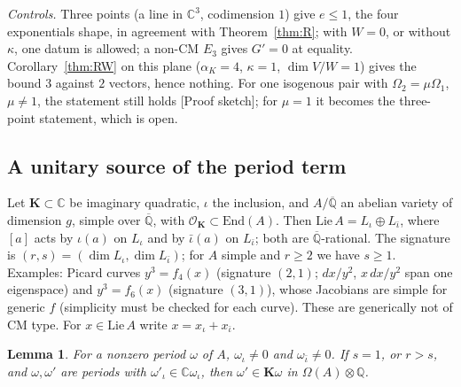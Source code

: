\documentclass[11pt]{amsart}
\newtheorem{lemma}[theorem]{Lemma}
\theoremstyle{definition}
\newcommand{\Qb}{\overline{\mathbb{Q}}}
\newcommand{\C}{\mathbb{C}}
\newcommand{\Q}{\mathbb{Q}}
\newcommand{\lab}[1]{\textup{[#1]}}
\begin{document}
\noindent\emph{Controls.} Three points (a line in $\C^3$, codimension $1$) give $e\le1$, the four exponentials shape, in
agreement with Theorem~\ref{thm:R}; with $W=0$, or without $\kappa$, one datum is allowed; a non-CM $E_3$ gives $G'=0$ at
equality. Corollary~\ref{thm:RW} on this plane ($\alpha_K=4$, $\kappa=1$, $\dim V/W=1$) gives the bound $3$ against $2$ vectors,
hence nothing. For one isogenous pair with $\Omega_2=\mu\Omega_1$, $\mu\ne1$, the statement still holds \lab{Proof sketch};
for $\mu=1$ it becomes the three-point statement, which is open.

\subsection{A unitary source of the period term}\label{sec:U}
Let $\mathbf K\subset\C$ be imaginary quadratic, $\iota$ the inclusion, and $A/\Qb$ an abelian variety of dimension $g$,
simple over $\Qb$, with $\mathcal O_{\mathbf K}\subset\mathrm{End}(A)$. Then $\mathrm{Lie}\,A=L_\iota\oplus L_{\bar\iota}$,
where $[a]$ acts by $\iota(a)$ on $L_\iota$ and by $\bar\iota(a)$ on $L_{\bar\iota}$; both are $\Qb$-rational. The signature is
$(r,s)=(\dim L_\iota,\dim L_{\bar\iota})$; for $A$ simple and $r\ge2$ we have $s\ge1$. Examples: Picard curves $y^3=f_4(x)$
(signature $(2,1)$; $dx/y^2$, $x\,dx/y^2$ span one eigenspace) and $y^3=f_6(x)$ (signature $(3,1)$), whose Jacobians are simple
for generic $f$ (simplicity must be checked for each curve). These are generically not of CM type. For $x\in\mathrm{Lie}\,A$
write $x=x_\iota+x_{\bar\iota}$.

\begin{lemma}\label{lem:Uper}
For a nonzero period $\omega$ of $A$, $\omega_\iota\ne0$ and $\omega_{\bar\iota}\ne0$. If $s=1$, or $r>s$, and
$\omega,\omega'$ are periods with $\omega'_\iota\in\C\omega_\iota$, then $\omega'\in\mathbf K\omega$ in $\Omega(A)\otimes\Q$.
\end{lemma}
\end{document}
